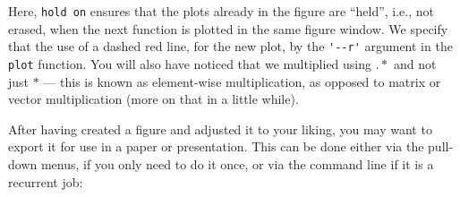 Here, \lstinline{hold on} ensures that the plots already in the figure are ``held'', i.e., not erased, when the next function is plotted in the same figure window.
We specify that the use of a dashed red line, for the new plot, by the \lstinline{'--r'} argument in the \lstinline{plot} function.
You will also have noticed that we multiplied using $.*$ and not just $*$ ---
this is known as element-wise multiplication, as opposed to matrix or vector multiplication (more on that in a little while).

After having created a figure and adjusted it to your liking, you may want to export it for use in a paper or presentation.
This can be done either via the pull-down menus, if you only need to do it once, or via the command line if it is a recurrent job: